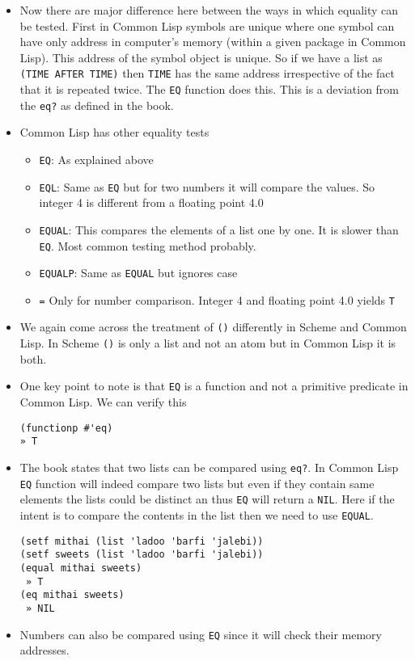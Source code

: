 \documentclass[11pt]{article}
\begin{document}
\begin{itemize}
\item Now there are major difference here between the ways in which equality can be tested. First in Common Lisp symbols
are unique where one symbol can have only address in computer's memory (within a given package in Common Lisp).
This address of the symbol object is unique. So if we have a list as \texttt{(TIME AFTER TIME)} then \texttt{TIME} has the same
address irrespective of the fact that it is repeated twice. The \texttt{EQ} function does this. This is a deviation from the
\texttt{eq?} as defined in the book.
\item Common Lisp has other equality tests
\begin{itemize}
\item \texttt{EQ}: As explained above
\item \texttt{EQL}: Same as \texttt{EQ} but for two numbers it will compare the values. So integer 4 is different from a floating
point 4.0
\item \texttt{EQUAL}: This compares the elements of a list one by one. It is slower than \texttt{EQ}. Most common testing method
probably.
\item \texttt{EQUALP}: Same as \texttt{EQUAL} but ignores case
\item \texttt{=} Only for number comparison. Integer 4 and floating point 4.0 yields \texttt{T}
\end{itemize}
\item We again come across the treatment of \texttt{()} differently in Scheme and Common Lisp. In Scheme \texttt{()} is only a list and
not an atom but in Common Lisp it is both.
\item One key point to note is that \texttt{EQ} is a function and not a primitive predicate in Common Lisp. We can verify this
\begin{verbatim}
(functionp #'eq)
» T

\end{verbatim}
\item The book states that two lists can be compared using \texttt{eq?}. In Common Lisp \texttt{EQ} function will indeed compare two
lists but even if they contain same elements the lists could be distinct an thus \texttt{EQ} will return a \texttt{NIL}. Here if
the intent is to compare the contents in the list then we need to use \texttt{EQUAL}.
\begin{verbatim}
(setf mithai (list 'ladoo 'barfi 'jalebi))
(setf sweets (list 'ladoo 'barfi 'jalebi))
(equal mithai sweets)
 » T
(eq mithai sweets)
 » NIL

\end{verbatim}
\item Numbers can also be compared using \texttt{EQ} since it will check their memory addresses.
\end{itemize}
\end{document}
